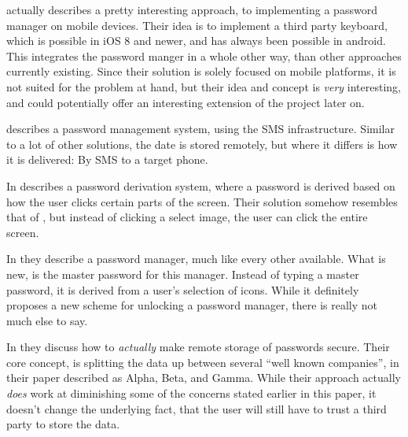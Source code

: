 			\cite{android} actually describes a pretty interesting approach, to implementing a password manager on mobile devices. Their idea is to implement a third party keyboard, which is possible in iOS 8 and newer, and has always been possible in android. This integrates the password manger in a whole other way, than other approaches currently existing. Since their solution is solely focused on mobile platforms, it is not suited for the problem at hand, but their idea and concept is \emph{very} interesting, and could potentially offer an interesting extension of the project later on.

			\cite{sms} describes a password management system, using the SMS infrastructure. Similar to a lot of other solutions, the date is stored remotely, but where it differs is how it is delivered: By SMS to a target phone. 

			In \cite{screen} describes a password derivation system, where a password is derived based on how the user clicks certain parts of the screen. Their solution somehow resembles that of \cite{stobert2014}, but instead of clicking a select image, the user can click the entire screen.

			In \cite{bicakci} they describe a password manager, much like every other available. What is new, is the master password for this manager. Instead of typing a master password, it is derived from a user's selection of icons. While it definitely proposes a new scheme for unlocking a password manager, there is really not much else to say.

			In \cite{nejad2012} they discuss how to \emph{actually} make remote storage of passwords secure. Their core concept, is splitting the data up between several ``well known companies'', in their paper described as Alpha, Beta, and Gamma. While their approach actually \emph{does} work at diminishing some of the concerns stated earlier in this paper, it doesn't change the underlying fact, that the user will still have to trust a third party to store the data.